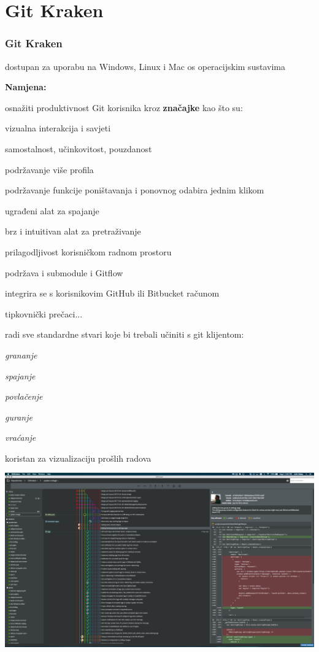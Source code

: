 \section{Git Kraken}
\begin{frame}[allowframebreaks]
\frametitle{Git Kraken}

\begin{itemize}
 \item dostupan za uporabu na Windows, Linux i Mac os operacijskim sustavima


 \item \textbf{Namjena:} 
 \item osnažiti produktivnost Git korisnika kroz \textbf{značajke} kao što su:
  {\setlength\itemindent{15pt}\item vizualna interakcija i savjeti}
  {\setlength\itemindent{15pt}\item samostalnost, učinkovitost, pouzdanost}
  {\setlength\itemindent{15pt}\item podržavanje više profila}
  {\setlength\itemindent{15pt}\item podržavanje funkcije poništavanja i ponovnog odabira jednim klikom}
  {\setlength\itemindent{15pt}\item ugrađeni alat za spajanje}
  {\setlength\itemindent{15pt}\item brz i intuitivan alat za pretraživanje}
  {\setlength\itemindent{15pt}\item prilagodljivost korisničkom radnom prostoru}
  {\setlength\itemindent{15pt}\item podržava i submodule i Gitflow}
  {\setlength\itemindent{15pt}\item integrira se s korisnikovim GitHub ili Bitbucket računom}
  {\setlength\itemindent{15pt}\item tipkovnički prečaci...}
 \framebreak
 \item radi sve standardne stvari koje bi trebali učiniti s git klijentom:
 		\item \textit{grananje}
 		\item \textit{spajanje}
 		\item \textit{povlačenje}
 		\item \textit{guranje}
 		\item \textit{vraćanje}
\framebreak
\item koristan za vizualizaciju prošlih radova

\end{itemize}

\begin{center}
    \includegraphics[width=0.8\linewidth]{images/gitkraken-UI.png}
\end{center}

\end{frame}